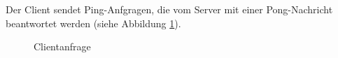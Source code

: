 Der Client sendet Ping-Anfgragen, die vom Server mit einer
Pong-Nachricht beantwortet werden (siehe Abbildung
\ref{umlsd:clientrequest}).


\begin{figure}[h]
    \centering
  \begin{sequencediagram}
  \end{sequencediagram}
  \caption{Clientanfrage}
  \label{umlsd:clientrequest}
\end{figure}



